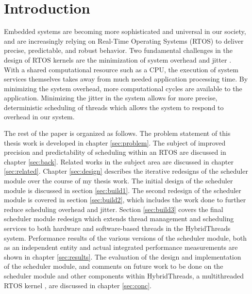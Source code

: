 \chapter{Introduction} \label{sec:intro} Embedded systems are becoming more
sophisticated and universal in our society, and are increasingly relying on
Real-Time Operating Systems (RTOS) to deliver precise, predictable, and robust
behavior.  Two fundamental challenges in the design of RTOS kernels are the
minimization of system overhead and jitter \cite{stankovicJitter}.  With a
shared computational resource such as a CPU, the execution of system services
themselves takes away from much needed application processing time.  By
minimizing the system overhead, more computational cycles are available to the
application.  Minimizing the jitter in the system allows for more precise,
deterministic scheduling of threads which allows the system to respond to
overhead in our system.

The rest of the paper is organized as follows.  The problem statement of this
thesis work is developed in chapter \ref{sec:problem}.  The subject of improved
precision and predictability of scheduling within an RTOS are discussed in
chapter \ref{sec:back}.  Related works in the subject area are discussed in
chapter \ref{sec:related}.  Chapter \ref{sec:design} describes the iterative
redesigns of the scheduler module over the course of my thesis work.  The
initial design of the scheduler module \cite{Agron:rt} is discussed in section
\ref{sec:build1}.  The second redesign of the scheduler module is covered in
section \ref{sec:build2}, which includes the work done to further reduce
scheduling overhead and jitter.  Section \ref{sec:build3} covers the final
scheduler module redesign which extends thread management and scheduling
services to both hardware and software-based threads in the HybridThreads
system.  Performance results of the various versions of the scheduler module,
both as an independent entity and actual integrated performance measurements
are shown in chapter \ref{sec:results}.  The evaluation of the design and
implementation of the scheduler module, and comments on future work to be done
on the scheduler module and other components within HybridThreads, a
multithreaded RTOS kernel
\cite{andrews04a,andrews04b,niehaus03,etfa05,Peck:dq}, are discussed in chapter
\ref{sec:conc}.

